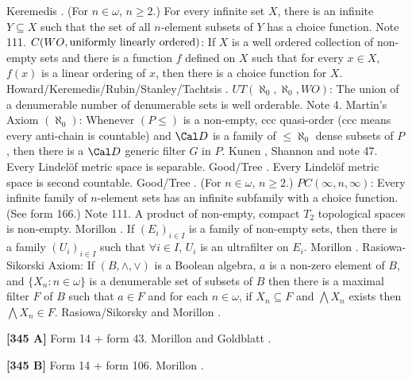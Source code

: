 \ac{Keremedis} \cite{1996b}.
\medskip
{} (For $n\in\omega$, $n\ge 2$.)  For every
infinite set $X$, there is an infinite $Y \subseteq X$ such that the
set of all $n$-element subsets of $Y$ has a choice function.  Note 111.
\medskip
{} $C(WO,\hbox{uniformly linearly ordered})$:  If
$X$ is a well ordered collection of non-empty sets and there is a function
$f$ defined on $X$ such that for every $x\in X$, $f(x)$ is a linear
ordering of $x$, then there is a choice function for $X$.
\ac{Howard/Keremedis/Rubin/Stanley/Tachtsis} \cite{1999}.
\medskip
{}  $UT(\aleph_0,\aleph_0,WO)$: The union
of a denumerable number of denumerable sets is well orderable.
Note 4.
\medskip
{}  Martin's Axiom $(\aleph_{0})$: Whenever
$(P\le)$ is a non-empty, ccc  quasi-order (ccc means every anti-chain
is countable) and ${\Cal D}$ is a family of $\le\aleph_0$ dense
subsets of $P$, then there is a ${\Cal D}$ generic filter $G$ in $P$.
\ac{Kunen} \cite{1980}, \ac{Shannon} \cite{1990} and note 47.
\medskip
{} Every Lindel\"of metric space is separable.
\ac{Good/Tree} \cite{1995}.
\medskip
{} Every Lindel\"of metric space is second countable.
\ac{Good/Tree} \cite{1995}.
\medskip
{}  (For $n\in\omega$, $n\ge 2$.)
$PC(\infty,n,\infty)$:  Every infinite family of $n$-element sets has
an infinite subfamily with a choice function. (See form 166.) Note 111.
\medskip
{}  A product of non-empty, compact $T_2$
topological spaces is non-empty.  \ac{Morillon} \cite{1988}.
\medskip
{}  If $(E_i)_{i\in I}$ is a family of non-empty
sets, then there is a family $(U_i)_{i\in I}$ such that $\forall i\in I$,
$U_i$ is an ultrafilter on $E_i$.  \ac{Morillon} \cite{1988}.
\medskip
{}  Rasiowa-Sikorski Axiom:  If $(B,\land,\lor)$
is a Boolean algebra, $a$ is a non-zero element of $B$, and
$\{X_n: n\in\omega\}$ is a denumerable set of subsets of $B$ then
there is a maximal filter $F$ of $B$ such that $a\in F$ and for
each $n\in\omega$, if $X_n\subseteq F$ and $\bigwedge X_n$ exists then
$\bigwedge X_n \in F$. \ac{Rasiowa/Sikorsky} \cite{1950} and  \ac{Morillon}
\cite{1988}.
\smallskip
\item{}{\bf [345 A]}  Form 14 + form 43.  \ac{Morillon} \cite{1988}
and \ac{Goldblatt} \cite{1985}.
\smallskip
\item{}{\bf [345 B]}  Form 14 + form 106.  \ac{Morillon} \cite{1988}.
